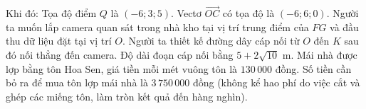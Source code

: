 \begin{ex}
\begin{center}
\end{center}
Khi đó:
\choiceTF
{Tọa độ điểm $Q$ là $(-6;3;5)$.}
{\True Vectơ $\overrightarrow{OC}$ có tọa độ là $(-6;6;0)$.}
{\True Người ta muốn lắp camera quan sát trong nhà kho tại vị trí trung điểm của $FG$ và đầu thu dữ liệu đặt tại vị trí $O$. Người ta thiết kế đường dây cáp nối từ $O$ đến $K$ sau đó nối thẳng đến camera. Độ dài đoạn cáp nối bằng $5+2\sqrt{10}$ m.}
{Mái nhà được lợp bằng tôn Hoa Sen, giá tiền mỗi mét vuông tôn là $130\,000$ đồng. Số tiền cần bỏ ra để mua tôn lợp mái nhà là $3\,750\,000$ đồng (không kể hao phí do việc cắt và ghép các miếng tôn, làm tròn kết quả đến hàng nghìn).}
\end{ex}
